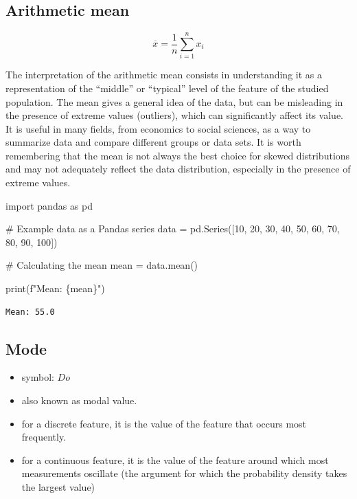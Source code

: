 \documentclass[
  english,
  letterpaper,
  DIV=11,
  numbers=noendperiod]{scrreprt}
\newenvironment{Shaded}{\begin{snugshade}}{\end{snugshade}}
\newcommand{\BuiltInTok}[1]{\textcolor[rgb]{0.00,0.23,0.31}{#1}}
\newcommand{\CommentTok}[1]{\textcolor[rgb]{0.37,0.37,0.37}{#1}}
\newcommand{\DecValTok}[1]{\textcolor[rgb]{0.68,0.00,0.00}{#1}}
\newcommand{\ImportTok}[1]{\textcolor[rgb]{0.00,0.46,0.62}{#1}}
\newcommand{\NormalTok}[1]{\textcolor[rgb]{0.00,0.23,0.31}{#1}}
\newcommand{\OperatorTok}[1]{\textcolor[rgb]{0.37,0.37,0.37}{#1}}
\newcommand{\SpecialCharTok}[1]{\textcolor[rgb]{0.37,0.37,0.37}{#1}}
\newcommand{\SpecialStringTok}[1]{\textcolor[rgb]{0.13,0.47,0.30}{#1}}
\providecommand{\tightlist}{%
  \setlength{\itemsep}{0pt}\setlength{\parskip}{0pt}}
\begin{document}
\subsection{Arithmetic mean}\label{arithmetic-mean}

\[\overline{x} = \frac{1}{n} \sum_{i=1}^n x_i\]

The interpretation of the arithmetic mean consists in understanding it
as a representation of the ``middle'' or ``typical'' level of the
feature of the studied population. The mean gives a general idea of the
data, but can be misleading in the presence of extreme values
(outliers), which can significantly affect its value. It is useful in
many fields, from economics to social sciences, as a way to summarize
data and compare different groups or data sets. It is worth remembering
that the mean is not always the best choice for skewed distributions and
may not adequately reflect the data distribution, especially in the
presence of extreme values.

\begin{Shaded}
\begin{Highlighting}[]
\ImportTok{import}\NormalTok{ pandas }\ImportTok{as}\NormalTok{ pd}

\CommentTok{\# Example data as a Pandas series}
\NormalTok{data }\OperatorTok{=}\NormalTok{ pd.Series([}\DecValTok{10}\NormalTok{, }\DecValTok{20}\NormalTok{, }\DecValTok{30}\NormalTok{, }\DecValTok{40}\NormalTok{, }\DecValTok{50}\NormalTok{, }\DecValTok{60}\NormalTok{, }\DecValTok{70}\NormalTok{, }\DecValTok{80}\NormalTok{, }\DecValTok{90}\NormalTok{, }\DecValTok{100}\NormalTok{])}

\CommentTok{\# Calculating the mean}
\NormalTok{mean }\OperatorTok{=}\NormalTok{ data.mean()}

\BuiltInTok{print}\NormalTok{(}\SpecialStringTok{f"Mean: }\SpecialCharTok{\{}\NormalTok{mean}\SpecialCharTok{\}}\SpecialStringTok{"}\NormalTok{)}
\end{Highlighting}
\end{Shaded}

\begin{verbatim}
Mean: 55.0
\end{verbatim}

\subsection{Mode}\label{mode}

\begin{itemize}
\tightlist
\item
  symbol: \(Do\)
\item
  also known as modal value.
\item
  for a discrete feature, it is the value of the feature that occurs
  most frequently.
\item
  for a continuous feature, it is the value of the feature around which
  most measurements oscillate (the argument for which the probability
  density takes the largest value)
\end{itemize}
\end{document}
